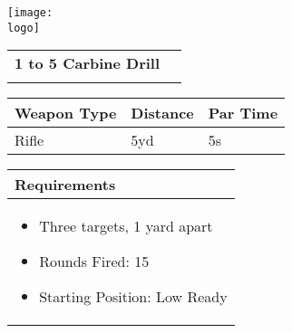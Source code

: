 \documentclass[../Cover.tex]{subfiles}
\begin{document}
	\begin{minipage}[t][0.2\textheight][t]{0.1\textwidth} 
		\texttt{[image: \\logo]}
	\end{minipage}
	\hfill
	\begin{minipage}[t][0.2\textheight][t]{0.8\textwidth}
		\begin{tabular}{ p{} l  }		
			\\	
			\small \textbf{1 to 5 Carbine Drill} \\
			\\[0.09\textheight]
		\end{tabular}
		\quad
		\begin{tabular}{ | p{} | p{} | p{} |}
			\hline
			\rowcolor[HTML]{C0C0C0}\tiny Weapon Type & \tiny Distance & \tiny Par Time\\ 
			\hline
			\tiny Rifle & \tiny 5yd & \tiny 5s \\ %
			\hline
		\end{tabular}
	\end{minipage}
	\begin{tabular}{p{}}
		\small Requirements \\
		\hline
		\tiny \begin{itemize} %
			\item Three targets, 1 yard apart
			\item Rounds Fired: 15
			\item Starting Position: Low Ready
		\end{itemize}
		\begin{center}
			
		\end{center}
				
		\\[0.6\textheight]
	\end{tabular}
\end{document}
